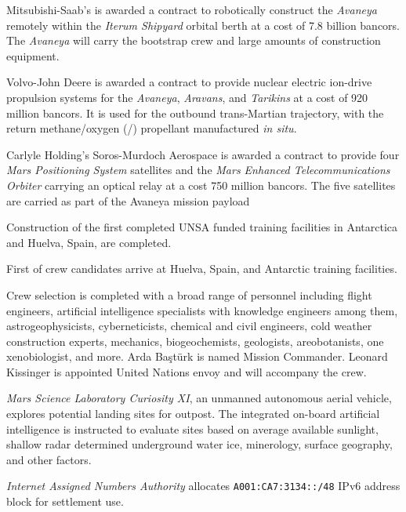 Mitsubishi-Saab's is awarded a contract to robotically construct the {\it Avaneya} remotely within the {\it Iterum Shipyard} orbital berth at a cost of 7.8 billion bancors. The {\it Avaneya} will carry the bootstrap crew and large amounts of construction equipment.

Volvo-John Deere is awarded a contract to provide nuclear electric ion-drive propulsion systems for the {\it Avaneya}, {\it Aravans}, and {\it Tarikins} at a cost of 920 million bancors. It is used for the outbound trans-Martian trajectory, with the return methane/oxygen (/) propellant manufactured {\it in situ}.

Carlyle Holding's Soros-Murdoch Aerospace is awarded a contract to provide four {\it Mars Positioning System} satellites and the {\it Mars Enhanced Telecommunications Orbiter} carrying an optical relay at a cost 750 million bancors. The five satellites are carried as part of the Avaneya mission payload
\StopTimelineDate

Construction of the first completed UNSA funded training facilities in Antarctica and Huelva, Spain, are completed.
\StopTimelineDate

First of crew candidates arrive at Huelva, Spain, and Antarctic training facilities.
\StopTimelineDate

Crew selection is completed with a broad range of personnel including flight engineers, artificial intelligence specialists with knowledge engineers among them, astrogeophysicists, cyberneticists, chemical and civil engineers, cold weather construction experts, mechanics, biogeochemists, geologists, areobotanists, one xenobiologist, and more. Arda Baştürk is named Mission Commander. Leonard Kissinger is appointed United Nations envoy and will accompany the crew.
\StopTimelineDate

{\it Mars Science Laboratory Curiosity XI}, an unmanned autonomous aerial vehicle, explores potential landing sites for outpost. The integrated on-board artificial intelligence is instructed to evaluate sites based on average available sunlight, shallow radar determined underground water ice, minerology, surface geography, and other factors.
\StopTimelineDate

{\it Internet Assigned Numbers Authority} allocates {\tt A001:CA7:3134::/48} IPv6 address block for settlement use. 
\StopTimelineDate

